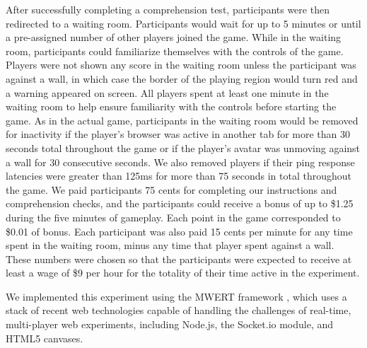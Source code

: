 \documentclass[12pt,letterpaper]{article}
\begin{document}
After successfully completing a comprehension test, participants were then redirected to a waiting room.
Participants would wait for up to 5 minutes or until a pre-assigned number of other players joined the game.
While in the waiting room, participants could familiarize themselves with the controls of the game.  Players were not shown any score in
the waiting room unless the participant was against a wall, in which
case the border of the playing region would turn red and a warning appeared on screen.  All players spent at least one minute in the waiting room to help ensure familiarity with the controls before starting the game. As in the actual game, participants in the
waiting room would be removed for inactivity if the player's browser
was active in another tab for more than 30 seconds total throughout the game or if the player's
avatar was unmoving against a wall for 30 consecutive seconds.  We also removed
players if their ping response latencies were greater than 125ms for
more than 75 seconds in total throughout the game.  We paid participants 75 cents for completing our
instructions and comprehension checks, and the participants could receive a bonus of up to
\$1.25 during the five minutes of gameplay. Each point in the game corresponded to \$0.01 of bonus. Each participant was also paid 15 cents
per minute for any time spent in the waiting room, minus any time that
player spent against a wall.  These numbers were chosen so that the
participants were expected to receive at least a wage of \$9 per hour for the totality of their time active in the
experiment.

We implemented this experiment using the MWERT framework \cite{hawkins_conducting_2014}, which uses a stack of recent web technologies capable of handling the challenges of real-time, multi-player web experiments, including Node.js, the Socket.io module, and HTML5 canvases.  
\end{document}
